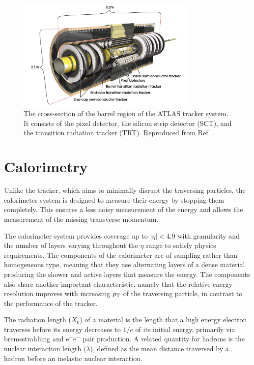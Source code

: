 \begin{figure}[h]
  \centering
  \includegraphics[width=0.8\textwidth]{figures/experiment/tracker}
  \caption[The ATLAS tracker]{The cross-section of the barrel region
  of the ATLAS tracker system. It consists of the pixel detector,
  the silicon strip detector (SCT), and the transition radiation
  tracker (TRT).
  Reproduced from Ref. \cite{Potamianos:2016ptf}.}
   \label{fig:exp:tracker}
\end{figure}

\section{Calorimetry}

Unlike the tracker, which aims to minimally disrupt the traversing
particles, the calorimeter system is designed to measure their
energy by stopping them completely. This ensures a less
noisy measurement of the energy and allows the measurement of
the missing transverse momentum.

The calorimeter system provides coverage
up to $|\eta| < 4.9$ with granularity and the number of layers varying
throughout the $\eta$ range to satisfy physics requirements. The
components of the calorimeter are of sampling rather than homogeneous
type, meaning that they use alternating layers of a dense material
producing the shower and active layers that measure the energy. The
components also share another important characteristic, namely that
the relative energy resolution improves with increasing $p_{\text{T}}$ of
the traversing particle, in contrast to the performance of the
tracker.

The radiation length ($X_0$) of a material is the length that a high
energy electron traverses before its energy decreases to $1/e$ of
its initial energy, primarily via bremsstrahlung and e$^+$e$^-$
pair production. A related quantity for hadrons is the nuclear
interaction length ($\lambda$), defined as the mean distance traversed by a
hadron before an inelastic nuclear interaction. 

